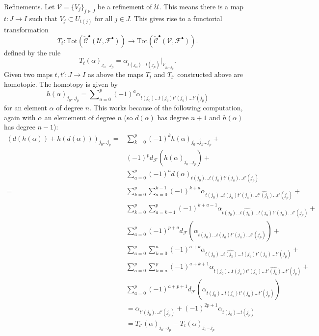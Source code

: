 \medskip\noindent
Refinements. Let ${\mathcal V} = \{ V_j \}_{j\in J}$ be a
refinement of ${\mathcal U}$. This means there is a map $t: J \to I$
such that $V_j \subset U_{t(j)}$ for all $j\in J$. This gives
rise to a functorial transformation
\begin{equation}
\label{equation-transformation}
T_t :
\text{Tot}(\check{\mathcal{C}}^\bullet({\mathcal U}, {\mathcal F}^\bullet))
\longrightarrow
\text{Tot}(\check{\mathcal{C}}^\bullet({\mathcal V}, {\mathcal F}^\bullet)).
\end{equation}
defined by the rule
$$
T_t(\alpha)_{j_0\ldots j_p}
=
\alpha_{t(j_0)\ldots t(j_p)}|_{V_{j_0\ldots j_p}}.
$$
Given two maps $t, t' : J \to I$ as above the maps
$T_t$ and $T_{t'}$ constructed above are homotopic.
The homotopy is given by
$$
h(\alpha)_{j_0\ldots j_p}
=
\sum\nolimits_{a = 0}^{p}
(-1)^a
\alpha_{t(j_0)\ldots t(j_a) t'(j_a) \ldots t'(j_p)}
$$
for an element $\alpha$ of degree $n$. This works
because of the following computation, again with
$\alpha$ an elemement of degree $n$ (so $d(\alpha)$
has degree $n + 1$ and $h(\alpha)$ has degree $n - 1$):
\begin{align*}
(
d(h(\alpha)) + h(d(\alpha))
)_{j_0\ldots j_p}
= &
\sum\nolimits_{k = 0}^p
(-1)^k
h(\alpha)_{j_0 \ldots \hat j_k \ldots j_p}
+ \\
&
(-1)^p
d_{\mathcal F}(h(\alpha)_{j_0 \ldots j_p})
+ \\
&
\sum\nolimits_{a = 0}^p
(-1)^a
d(\alpha)_{t(j_0) \ldots t(j_a) t'(j_a) \ldots t'(j_p)}
\\
= &
\sum\nolimits_{k = 0}^p
\sum\nolimits_{a = 0}^{k - 1}
(-1)^{k + a}
\alpha_{t(j_0)\ldots t(j_a)t'(j_a)\ldots \hat{t'(j_k)}\ldots t'(j_p)}
+ \\
&
\sum\nolimits_{k = 0}^p
\sum\nolimits_{a = k + 1}^p
(-1)^{k + a - 1}
\alpha_{t(j_0)\ldots \hat{t(j_k)}\ldots t(j_a)t'(j_a)\ldots t'(j_p)}
+ \\
&
\sum\nolimits_{a = 0}^p
(-1)^{p + a}
d_{\mathcal F}(\alpha_{t(j_0)\ldots t(j_a) t'(j_a) \ldots t'(j_p)})
+ \\
&
\sum\nolimits_{a = 0}^p
\sum\nolimits_{k = 0}^a
(-1)^{a + k}
\alpha_{t(j_0)\ldots\hat{t(j_k)}\ldots t(j_a)t'(j_a)\ldots t'(j_p)}
+ \\
&
\sum\nolimits_{a = 0}^p
\sum\nolimits_{k = a}^p
(-1)^{a + k + 1}
\alpha_{t(j_0) \ldots t(j_a) t'(j_a) \ldots \hat{t'(j_k)} \ldots t'(j_p)}
+ \\
&
\sum\nolimits_{a = 0}^p
(-1)^{a + p + 1}
d_{\mathcal F}(\alpha_{t(j_0)\ldots t(j_a) t'(j_a) \ldots t'(j_p)})
\\
& =
\alpha_{t'(j_0)\ldots t'(j_p)} +
(-1)^{2p + 1}\alpha_{t(j_0)\ldots t(j_p)}
\\
& =
T_{t'}(\alpha)_{j_0\ldots j_p} - T_t(\alpha)_{j_0\ldots j_p}
\end{align*}
